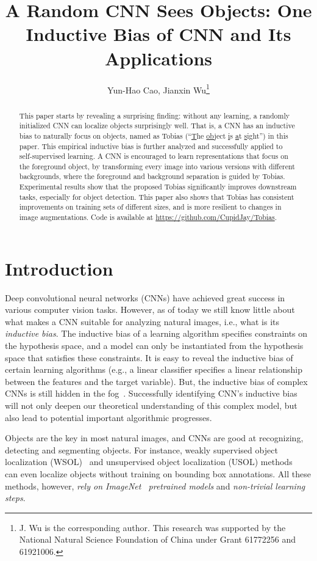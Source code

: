 \documentclass[letterpaper]{article}
\title{A Random CNN Sees Objects: One Inductive Bias of CNN and Its Applications}
\author{
Yun-Hao Cao, Jianxin Wu\thanks{J. Wu is the corresponding author. This research was supported by the National Natural Science Foundation of China under Grant 61772256 and 61921006.}
}
\begin{document}
\maketitle

\begin{abstract}
	This paper starts by revealing a surprising finding: without any learning, a randomly initialized CNN can localize objects surprisingly well. That is, a CNN has an inductive bias to naturally focus on objects, named as Tobias (``\underline{T}he \underline{ob}ject \underline{i}s \underline{a}t \underline{s}ight'') in this paper. This empirical inductive bias is further analyzed and successfully applied to self-supervised learning. A CNN is encouraged to learn representations that focus on the foreground object, by transforming every image into various versions with different backgrounds, where the foreground and background separation is guided by Tobias. Experimental results show that the proposed Tobias significantly improves downstream tasks, especially for object detection. This paper also shows that Tobias has consistent improvements on training sets of different sizes, and is more resilient to changes in image augmentations. Code is available at \url{https://github.com/CupidJay/Tobias}.
\end{abstract}

\section{Introduction}

Deep convolutional neural networks (CNNs) have achieved great success in various computer vision tasks. However, as of today we still know little about what makes a CNN suitable for analyzing natural images, i.e., what is its \emph{inductive bias}. The inductive bias of a learning algorithm specifies constraints on the hypothesis space, and a model can only be instantiated from the hypothesis space that satisfies these constraints. It is easy to reveal the inductive bias of certain learning algorithms (e.g., a linear classifier specifies a linear relationship between the features and the target variable). But, the inductive bias of complex CNNs is still hidden in the fog~\citep{bias:cohen:ICLR17}. Successfully identifying CNN's inductive bias will not only deepen our theoretical understanding of this complex model, but also lead to potential important algorithmic progresses.

Objects are the key in most natural images, and CNNs are good at recognizing, detecting and segmenting objects. For instance, weakly supervised object localization (WSOL)~\citep{cam:zhou:CVPR16, gradcam:ICCV17, psol:zhang:CVPR20} and unsupervised object localization (USOL) methods~\citep{scda:tip17, ddt:wei:pr19} can even localize objects without training on bounding box annotations. All these methods, however, \textit{rely on ImageNet~\citep{ILSVRC2012:russakovsky:IJCV15} pretrained models} and \emph{non-trivial learning steps}.
\end{document}
